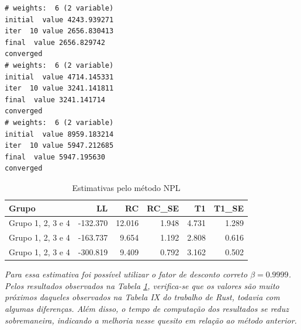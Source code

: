 \documentclass[12pt,a4paper]{article}
\newenvironment{Shaded}{\begin{snugshade}}{\end{snugshade}}
\newcommand{\CommentTok}[1]{\textcolor[rgb]{0.56,0.35,0.01}{\textit{#1}}}
\newcommand{\DataTypeTok}[1]{\textcolor[rgb]{0.13,0.29,0.53}{#1}}
\newcommand{\DecValTok}[1]{\textcolor[rgb]{0.00,0.00,0.81}{#1}}
\newcommand{\KeywordTok}[1]{\textcolor[rgb]{0.13,0.29,0.53}{\textbf{#1}}}
\newcommand{\NormalTok}[1]{#1}
\newcommand{\OperatorTok}[1]{\textcolor[rgb]{0.81,0.36,0.00}{\textbf{#1}}}
\newcommand{\OtherTok}[1]{\textcolor[rgb]{0.56,0.35,0.01}{#1}}
\newcommand{\StringTok}[1]{\textcolor[rgb]{0.31,0.60,0.02}{#1}}
\begin{document}
\begin{Shaded}
\begin{Highlighting}[]
{{\CommentTok{# Juntar com resultado do grupo anterior}
\NormalTok{resultados <-}\StringTok{ }\KeywordTok{rbind}\NormalTok{(resultados,r)}

\NormalTok{\}}
\end{Highlighting}
\end{Shaded}

\begin{verbatim}
# weights:  6 (2 variable)
initial  value 4243.939271 
iter  10 value 2656.830413
final  value 2656.829742 
converged
# weights:  6 (2 variable)
initial  value 4714.145331 
iter  10 value 3241.141811
final  value 3241.141714 
converged
# weights:  6 (2 variable)
initial  value 8959.183214 
iter  10 value 5947.212685
final  value 5947.195630 
converged
\end{verbatim}

\begin{Shaded}
\end{Shaded}

\begin{table}[ht]
\centering
\begin{tabular}{lrrrrr}
  \hline
Grupo & LL & RC & RC\_SE & T1 & T1\_SE \\ 
  \hline
Grupo 1, 2, 3 e 4 & -132.370 & 12.016 & 1.948 & 4.731 & 1.289 \\ 
  Grupo 1, 2, 3 e 4 & -163.737 & 9.654 & 1.192 & 2.808 & 0.616 \\ 
  Grupo 1, 2, 3 e 4 & -300.819 & 9.409 & 0.792 & 3.162 & 0.502 \\ 
   \hline
\end{tabular}
\caption{Estimativas pelo método NPL} 
\label{tab:5}
\end{table}

\emph{Para essa estimativa foi possível utilizar o fator de desconto
correto \(\beta=0.9999\). Pelos resultados observados na Tabela
\ref{tab:5}, verifica-se que os valores são muito próximos daqueles
observados na Tabela IX do trabalho de Rust, todavia com algumas
diferenças. Além disso, o tempo de computação dos resultados se reduz
sobremaneira, indicando a melhoria nesse quesito em relação ao método
anterior.}
\end{document}
